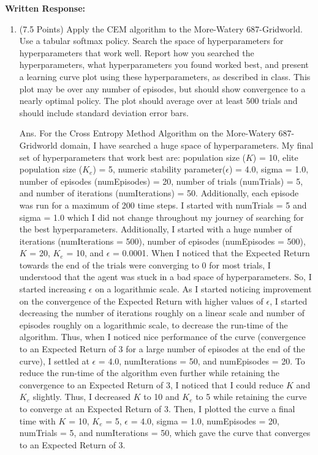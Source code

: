 \documentclass[]{article}
\begin{document}
\noindent\textbf{Written Response:}

\begin{enumerate}
    \item (7.5 Points) Apply the CEM algorithm to the More-Watery 687-Gridworld. Use a tabular softmax policy. Search the space of hyperparameters for hyperparameters that work well. Report how you searched the hyperparameters, what hyperparameters you found worked best, and present a learning curve plot using these hyperparameters, as described in class. This plot may be over any number of episodes, but should show convergence to a nearly optimal policy. The plot should average over at least $500$ trials and should include standard deviation error bars. 

	{
		\color{blue}
		Ans. For the Cross Entropy Method Algorithm on the More-Watery 687-Gridworld domain, I have searched a huge space of hyperparameters. My final set of hyperparameters that work best are: population size ($K$) = 10, elite population size ($K_e$) = 5, numeric stability parameter($\epsilon$) = 4.0, sigma = 1.0, number of episodes (numEpisodes) = 20, number of trials (numTrials) = 5, and number of iterations (numIterations) = 50. Additionally, each episode was run for a maximum of 200 time steps. I started with numTrials = 5 and sigma = 1.0  which I did not change throughout my journey of searching for the best hyperparameters. Additionally,  I started with a huge number of iterations (numIterations = 500), number of episodes (numEpisodes = 500),  $K$ = 20, $K_e$ = 10, and $\epsilon$ = 0.0001. When I noticed that the Expected Return towards the end of the trials were converging to 0 for most trials, I understood that the agent was stuck in a bad space of hyperparameters. So, I started increasing $\epsilon$ on a logarithmic scale. As I started noticing improvement on the convergence of the Expected Return with higher values of $\epsilon$, I started decreasing the number of iterations roughly on a linear scale and number of episodes roughly on a logarithmic scale, to decrease the run-time of the algorithm. Thus, when I noticed nice performance of the curve (convergence to an Expected Return of 3 for a large number of episodes at the end of the curve), I settled at $\epsilon$ = 4.0, numIterations = 50, and numEpisodes = 20. To reduce the run-time of the algorithm even further while retaining the convergence to an Expected Return of 3, I noticed that I could reduce $K$ and $K_e$ slightly. Thus, I decreased $K$ to 10 and $K_e$ to 5 while retaining the curve to converge at an Expected Return of 3. Then, I plotted the curve a final time with  $K$ = 10, $K_e$ = 5, $\epsilon$ = 4.0, sigma = 1.0, numEpisodes = 20, numTrials = 5, and numIterations = 50, which gave the curve that converges to an Expected Return of 3.
		
}
\end{enumerate}
\end{document}
